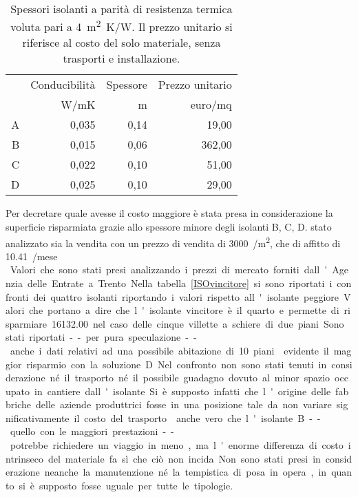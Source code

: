 \begin{table}[htb]
\centering
\caption[Confronto degli spessori degli isolanti a parità di resistenza termica]{Spessori isolanti a parità di resistenza termica voluta pari a \SI{4}{m^2K/W}. Il prezzo unitario si riferisce al costo del solo materiale, senza trasporti e installazione.}
\label{tab:Isolanti}
\begin{tabular}{@{}rrrr@{}}
\toprule
  & Conducibilità & Spessore & Prezzo unitario \\ 
  & W/mK          & m        & euro/mq            \\ \midrule
A & 0,035         & 0,14     & 19,00           \\
B & 0,015         & 0,06     & 362,00          \\
C & 0,022         & 0,10     & 51,00           \\
D & 0,025         & 0,10     & 29,00           \\ \bottomrule
\end{tabular}%
\end{table}

Per decretare quale avesse il costo maggiore è stata presa in considerazione la superficie risparmiata grazie allo spessore minore degli isolanti B, C, D.
\e stato analizzato sia la vendita con un  prezzo di vendita di \SI{3000}{\teuro / \square\metre}, che di affitto di \SI{10.41}{\teuro /\square\metre mese }. Valori che sono stati presi analizzando i prezzi di mercato forniti dall'Agenzia delle Entrate a Trento.


Nella tabella \ref{ISOvincitore} si sono riportati i confronti dei quattro isolanti riportando i valori rispetto all'isolante peggiore.
Valori che portano a dire che l'isolante vincitore è il quarto e permette di risparmiare \SI{16132.00}{\teuro} nel caso delle cinque villette a schiere di due piani.
Sono stati riportati -- per pura speculazione -- anche i dati relativi ad una possibile abitazione di 10 piani.
\e evidente il maggior risparmio con la soluzione D.

Nel confronto non sono stati tenuti in considerazione né il trasporto né il possibile guadagno dovuto al minor spazio occupato in cantiere dall'isolante.
Si è supposto infatti che l'origine delle fabbriche delle aziende produttrici fosse in una posizione tale da non variare significativamente il costo del trasporto. 
\e anche vero che l'isolante B -- quello con le maggiori prestazioni -- potrebbe richiedere un viaggio in meno, ma l'enorme differenza di costo intrinseco del materiale fa sì che ciò non incida.

Non sono stati presi in considerazione neanche la manutenzione né la tempistica di posa in opera, in quanto si è supposto fosse uguale per tutte le tipologie.
